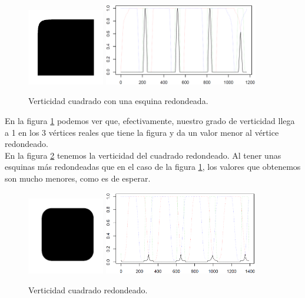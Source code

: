 \begin{figure}[H]
\begin{center}

\includegraphics[width=0.3\textwidth]{img/fig4.png} \hfill \includegraphics[width=0.6\textwidth]{img/vert-fig04-novvery.png}
\end{center}

\caption{Verticidad cuadrado con una esquina redondeada.}
\label{fig11}
\end{figure}

En la figura \ref{fig11} podemos ver que, efectivamente, nuestro grado de verticidad llega a 1 en los 3 vértices reales que tiene la figura y da un valor menor al vértice redondeado.\\

En la figura \ref{fig12} tenemos la verticidad del cuadrado redondeado. Al tener unas esquinas más redondeadas que en el caso de la figura \ref{fig11}, los valores que obtenemos son mucho menores, como es de esperar.\\

\begin{figure}[H]
\begin{center}

\includegraphics[width=0.3\textwidth]{img/device3-1.png} \hfill \includegraphics[width=0.6\textwidth]{img/vert-dev3-1-limpio.png}
\end{center}

\caption{Verticidad cuadrado redondeado.}
\label{fig12}
\end{figure}

